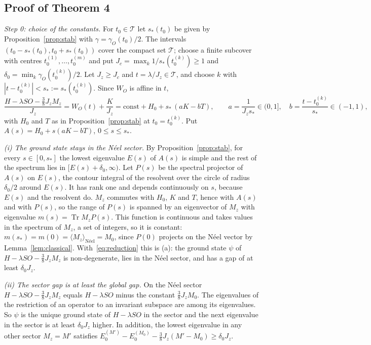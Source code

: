 \documentclass[aps,prx,onecolumn,10pt,nofootinbib,longbibliography,floatfix]{revtex4-2}
\theoremstyle{remark}
\newcommand{\Jz}{J_z}
\newcommand{\Tr}{\operatorname{Tr}}
\begin{document}
\subsection{Proof of Theorem 4} %

\emph{Step 0: choice of the constants.} For $t_0\in\mathcal T$ let $s_*(t_0)$ be given by Proposition~\ref{prop:stab} with %
$\gamma=\gamma_O(t_0)/2$. The intervals $(t_0-s_*(t_0),t_0+s_*(t_0))$ cover the compact set $\mathcal T$; choose a finite
subcover with centres $t_0^{(1)},\dots,t_0^{(m)}$ and put
$J_c=\max_k1/s_*(t_0^{(k)})\ge1$ and $\delta_0=\min_k\gamma_O(t_0^{(k)})/2$. Let $\Jz\ge J_c$ and $t=\lambda/\Jz\in\mathcal T$, and
choose $k$ with $|t-t_0^{(k)}|<s_*:=s_*(t_0^{(k)})$. Since $W_O$ is affine in $t$,
\begin{equation}
\frac{H-\lambda SO-\frac38\Jz M_z}{\Jz}=W_O(t)+\frac{K}{\Jz}=\mathrm{const}+H_0+s_*\,(aK-bT),\qquad %
a=\frac1{\Jz s_*}\in(0,1],\quad b=\frac{t-t_0^{(k)}}{s_*}\in(-1,1), %
\label{eq:reduction}
\end{equation}
with $H_0$ and $T$ as in Proposition~\ref{prop:stab} at $t_0=t_0^{(k)}$. Put $A(s)=H_0+s(aK-bT)$, $0\le s\le s_*$.

\emph{(i) The ground state stays in the N\'eel sector.} By Proposition~\ref{prop:stab}, for every $s\in[0,s_*]$ the
lowest eigenvalue $E(s)$ of $A(s)$ is simple and the rest of the spectrum lies in $[E(s)+\delta_0,\infty)$. Let
$P(s)$ be the spectral projector of $A(s)$ on $E(s)$, the contour integral of the resolvent over the circle of
radius $\delta_0/2$ around $E(s)$. It has rank one and depends continuously on $s$, because $E(s)$ and the
resolvent do. $M_z$ commutes with $H_0$, $K$ and $T$, hence with $A(s)$ and with $P(s)$, so the range of $P(s)$ is spanned by
an eigenvector of $M_z$ with eigenvalue $m(s)=\Tr M_zP(s)$. This function is continuous and takes values in the
spectrum of $M_z$, a set of integers, so it is constant: $m(s_*)=m(0)=\langle M_z\rangle_{\text{N\'eel}}=M_0$, since
$P(0)$ projects on the N\'eel vector by Lemma~\ref{lem:classical}. With~\eqref{eq:reduction} this is (a): the ground
state $\psi$ of $H-\lambda SO-\frac38\Jz M_z$ is non-degenerate, lies in the N\'eel sector, and has a gap of at least
$\delta_0\Jz$.

\emph{(ii) The sector gap is at least the global gap.} On the N\'eel sector $H-\lambda SO-\frac38\Jz M_z$ equals
$H-\lambda SO$ minus the constant $\frac38\Jz M_0$. The eigenvalues of the restriction of an operator to an invariant
subspace are among its eigenvalues. So $\psi$ is the unique ground state of $H-\lambda SO$ in the sector and the
next eigenvalue in the sector is at least $\delta_0\Jz$ higher. In addition, the lowest eigenvalue in any other
sector $M_z=M'$ satisfies $E_0^{(M')}-E_0^{(M_0)}-\frac38\Jz (M'-M_0)\ge\delta_0\Jz$.
\end{document}
